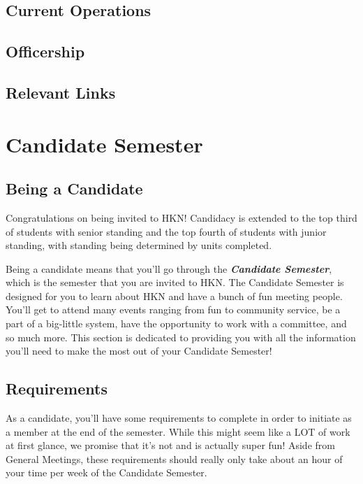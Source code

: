 \documentclass[11pt, article, oneside]{memoir}
\begin{document}
    \section{Current Operations}
    \section{Officership}
    \section{Relevant Links}

    \newpage
    \chapter{Candidate Semester}

    \section{Being a Candidate}
        Congratulations on being invited to HKN! Candidacy is extended to the top third of students with senior standing and the top fourth of students with junior standing, with standing being determined by units completed. 
        
        \bigbreak

        Being a candidate means that you'll go through the \textbf{\emph{Candidate Semester}}, which is the semester that you are invited to HKN. The Candidate Semester is designed for you to learn about HKN and have a bunch of fun meeting people. You'll get to attend many events ranging from fun to community service, be a part of a big-little system, have the opportunity to work with a committee, and so much more. This section is dedicated to providing you with all the information you'll need to make the most out of your Candidate Semester!


    \section{Requirements}
        As a candidate, you'll have some requirements to complete in order to initiate as a member at the end of the semester. While this might seem like a LOT of work at first glance, we promise that it's not and is actually super fun! Aside from  General Meetings, these requirements should really only take about an hour of your time per week of the Candidate Semester.
        
\end{document}
